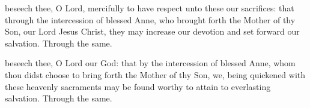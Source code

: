 
\secret
{} beseech thee, O Lord, mercifully to have respect unto these our sacrifices: that through the intercession of blessed Anne, who brought forth the Mother of thy Son, our Lord Jesus Christ, they may increase our devotion and set forward our salvation. Through the same.


\postcommunion
{} beseech thee, O Lord our God: that by the intercession of blessed Anne, whom thou didst choose to bring forth the Mother of thy Son, we, being quickened with these heavenly sacraments may be found worthy to attain to everlasting salvation. Through the same.

